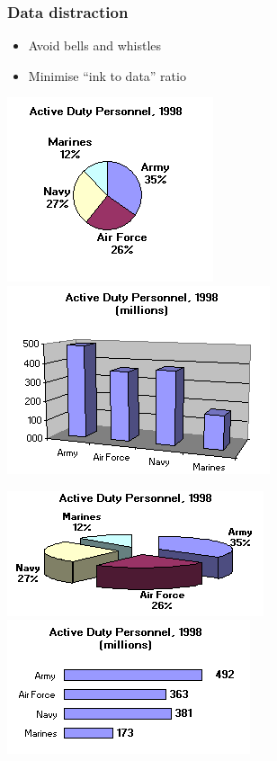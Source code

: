 \documentclass{beamer}
\begin{document}
\begin{frame}
  \frametitle{Data distraction}

  \begin{itemize}
    \item Avoid bells and whistles
    \item Minimise ``ink to data'' ratio
  \end{itemize}

  \centering
  \includegraphics[width=.4\textwidth]{img/les2-04}
  \includegraphics[width=.4\textwidth]{img/les2-05}

  \includegraphics[width=.4\textwidth]{img/les2-06}
  \includegraphics[width=.4\textwidth]{img/les2-07}
\end{frame}
\end{document}
